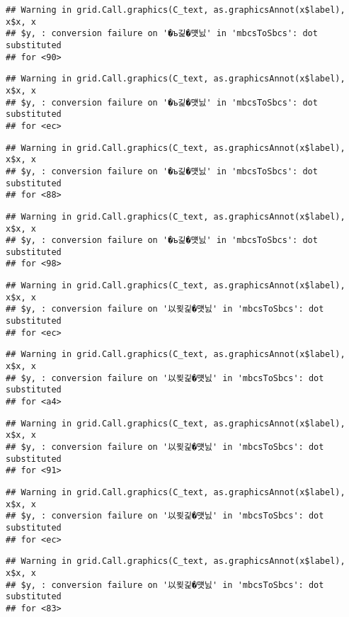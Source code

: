 \documentclass[]{article}
\begin{document}
\begin{verbatim}
## Warning in grid.Call.graphics(C_text, as.graphicsAnnot(x$label), x$x, x
## $y, : conversion failure on '�ъ긽�먯닔' in 'mbcsToSbcs': dot substituted
## for <90>
\end{verbatim}

\begin{verbatim}
## Warning in grid.Call.graphics(C_text, as.graphicsAnnot(x$label), x$x, x
## $y, : conversion failure on '�ъ긽�먯닔' in 'mbcsToSbcs': dot substituted
## for <ec>
\end{verbatim}

\begin{verbatim}
## Warning in grid.Call.graphics(C_text, as.graphicsAnnot(x$label), x$x, x
## $y, : conversion failure on '�ъ긽�먯닔' in 'mbcsToSbcs': dot substituted
## for <88>
\end{verbatim}

\begin{verbatim}
## Warning in grid.Call.graphics(C_text, as.graphicsAnnot(x$label), x$x, x
## $y, : conversion failure on '�ъ긽�먯닔' in 'mbcsToSbcs': dot substituted
## for <98>
\end{verbatim}

\begin{verbatim}
## Warning in grid.Call.graphics(C_text, as.graphicsAnnot(x$label), x$x, x
## $y, : conversion failure on '以묒긽�먯닔' in 'mbcsToSbcs': dot substituted
## for <ec>
\end{verbatim}

\begin{verbatim}
## Warning in grid.Call.graphics(C_text, as.graphicsAnnot(x$label), x$x, x
## $y, : conversion failure on '以묒긽�먯닔' in 'mbcsToSbcs': dot substituted
## for <a4>
\end{verbatim}

\begin{verbatim}
## Warning in grid.Call.graphics(C_text, as.graphicsAnnot(x$label), x$x, x
## $y, : conversion failure on '以묒긽�먯닔' in 'mbcsToSbcs': dot substituted
## for <91>
\end{verbatim}

\begin{verbatim}
## Warning in grid.Call.graphics(C_text, as.graphicsAnnot(x$label), x$x, x
## $y, : conversion failure on '以묒긽�먯닔' in 'mbcsToSbcs': dot substituted
## for <ec>
\end{verbatim}

\begin{verbatim}
## Warning in grid.Call.graphics(C_text, as.graphicsAnnot(x$label), x$x, x
## $y, : conversion failure on '以묒긽�먯닔' in 'mbcsToSbcs': dot substituted
## for <83>
\end{verbatim}
\end{document}
